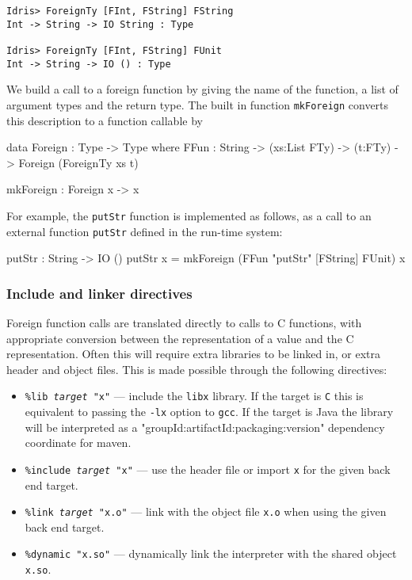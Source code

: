 \begin{lstlisting}
Idris> ForeignTy [FInt, FString] FString
Int -> String -> IO String : Type

Idris> ForeignTy [FInt, FString] FUnit 
Int -> String -> IO () : Type
\end{lstlisting}

\noindent
We build a call to a foreign function by giving the name of the function, a list of
argument types and the return type. The built in function \texttt{mkForeign}
converts this description to a function callable by \Idris{}

\begin{code}
data Foreign : Type -> Type where
    FFun : String -> (xs:List FTy) -> (t:FTy) -> 
           Foreign (ForeignTy xs t)

mkForeign : Foreign x -> x
\end{code}

\noindent
For example, the \texttt{putStr} function is implemented as follows, as a call to 
an external function \texttt{putStr} defined in the run-time system:

\begin{code}
putStr : String -> IO ()
putStr x = mkForeign (FFun "putStr" [FString] FUnit) x
\end{code}

\subsubsection*{Include and linker directives}

Foreign function calls are translated directly to calls to C functions, with appropriate
conversion between the \Idris{} representation of a value and the C representation.
Often this will require extra libraries to be linked in, or extra header and object files.
This is made possible through the following directives:

\begin{itemize}
\item \texttt{\%lib \emph{target} "x"} --- include the \texttt{libx} library. If the target is \texttt{C} this is equivalent to passing the
\texttt{-lx} option to \texttt{gcc}. If the target is Java the library will be interpreted as a 
"groupId:artifactId:packaging:version" dependency coordinate for maven.
\item \texttt{\%include \emph{target} "x"} --- use the header file or import \texttt{x} for the given back end target.
\item \texttt{\%link \emph{target} "x.o"} --- link with the object file \texttt{x.o} when using the given back end target.
\item \texttt{\%dynamic "x.so"} --- dynamically link the interpreter with the shared object \texttt{x.so}.
\end{itemize}

